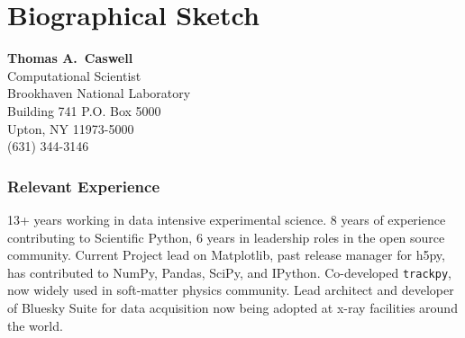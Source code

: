 \documentclass[12pt]{article}
\numberwithin{page}{section}
\begin{document}

\newpage
\section{Biographical Sketch}
\setcounter{page}{1}
\begin{center}
  \textbf{Thomas A.\ Caswell}\\
  Computational Scientist\\
  Brookhaven National Laboratory\\
  Building 741 P.O. Box 5000\\
  Upton, NY 11973-5000\\
  (631) 344-3146\\
\end{center}

\subsubsection*{Relevant Experience}
13+ years working in data intensive experimental science.  8 years of
experience contributing to Scientific Python, 6 years in leadership
roles in the open source community.  Current Project lead on
Matplotlib, past release manager for h5py, has contributed to NumPy,
Pandas, SciPy, and IPython.  Co-developed \texttt{trackpy}, now widely
used in soft-matter physics community.  Lead architect and developer
of Bluesky Suite for data acquisition now being adopted at x-ray
facilities around the world.
\end{document}
